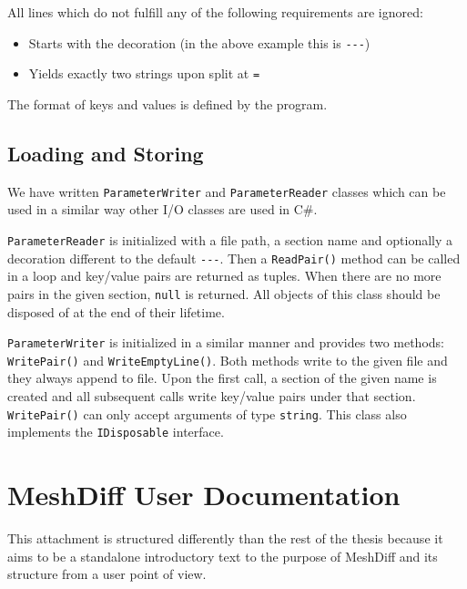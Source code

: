 All lines which do not fulfill any of the following requirements are ignored:

\begin{itemize}
\item Starts with the decoration (in the above example this is \verb+---+)
\item Yields exactly two strings upon split at \verb+=+
\end{itemize}

The format of keys and values is defined by the program.
\subsection{Loading and Storing}
\label{attch:parameter_load_store-load_store}

We have written \verb+ParameterWriter+ and \verb+ParameterReader+ classes which can be used in a similar way other I/O classes are used in C\#.

\verb+ParameterReader+ is initialized with a file path, a section name and optionally a decoration different to the default \verb+---+. Then a \verb+ReadPair()+ method can be called in a loop and key/value pairs are returned as tuples. When there are no more pairs in the given section, \verb+null+ is returned. All objects of this class should be disposed of at the end of their lifetime.

\verb+ParameterWriter+ is initialized in a similar manner and provides two methods: \verb+WritePair()+ and \verb+WriteEmptyLine()+. Both methods write to the given file and they always append to file. Upon the first call, a section of the given name is created and all subsequent calls write key/value pairs under that section. \verb+WritePair()+ can only accept arguments of type \verb+string+. This class also implements the \verb+IDisposable+ interface.

\clearpage

\section{MeshDiff User Documentation}
\label{attch:user_doc}

This attachment is structured differently than the rest of the thesis because it aims to be a standalone introductory text to the purpose of MeshDiff and its structure from a user point of view.

